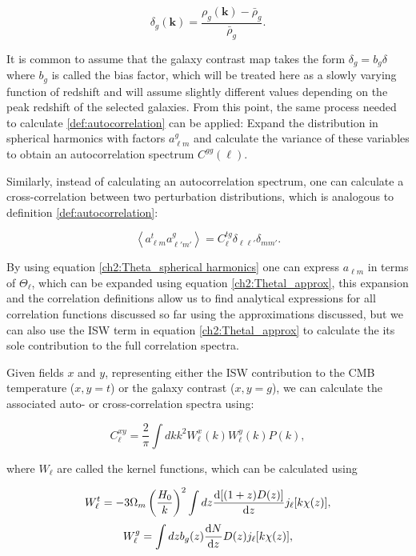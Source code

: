 \documentclass[openany,a4paper,12pt,oneside]{book}
\newcommand{\av}[1]{\left\langle #1 \right\rangle} %
\begin{document}
\begin{spacing}{1.5}
\begin{equation}\label{def:contrast_map}
	\delta_g(\mathbf{k})=\frac{\rho_g(\mathbf{k})-\bar{\rho}_g}{\bar{\rho}_g}.
\end{equation}

It is common to assume that the galaxy contrast map takes the form $\delta_g=b_g\delta$ where $b_g$ is called the bias factor, which will be treated here as a slowly varying function of redshift and will assume slightly different values depending on the peak redshift of the selected galaxies. From this point, the same process needed to calculate \eqref{def:autocorrelation} can be applied: Expand the distribution in spherical harmonics with factors $a_{\ell m}^g$ and calculate the variance of these variables to obtain an autocorrelation spectrum $C^{gg}(\ell)$.

Similarly, instead of calculating an autocorrelation spectrum, one can calculate a cross-correlation between two perturbation distributions, which is analogous to definition \eqref{def:autocorrelation}:

\begin{equation}\label{av(ag, at)}
    \av{a_{\ell m}^ta_{\ell' m'}^g}=C^{tg}_\ell\delta_{\ell \ell'}\delta_{mm'}.
\end{equation}

By using equation \eqref{ch2:Theta_spherical harmonics} one can express $a_{\ell m}$ in terms of $\Theta_\ell$, which can be expanded using equation \eqref{ch2:Thetal_approx}, this expansion and the correlation definitions allow us to find analytical expressions for all correlation functions discussed so far using the approximations discussed, but we can also use the ISW term in equation \eqref{ch2:Thetal_approx} to calculate the its sole contribution to the full correlation spectra. 

Given fields $x$ and $y$, representing either the ISW contribution to the CMB temperature ($x,y=t$) or the galaxy contrast ($x,y=g$), we can calculate the associated auto- or cross-correlation spectra using:

\begin{equation}\label{Cl_direct_calculation}
    C^{xy}_\ell=\frac{2}{\pi}\int dk k^2 W_\ell^x(k)W_\ell^y(k)P(k),
\end{equation}

\noindent where $W_\ell$ are called the kernel functions, which can be calculated using

\begin{equation}\label{Wt}
    W_\ell^t=-3\Omega_m\left(\frac{H_0}{k}\right)^2\int dz \dv{[(1+z)D(z)]}{z} j_\ell[k\chi(z)],
\end{equation}
\begin{equation}\label{Wg}
    W_\ell^g=\int dz b_g(z)\dv{N}{z}D(z)j_\ell[k\chi(z)],
\end{equation}


\end{spacing}
\end{document}
